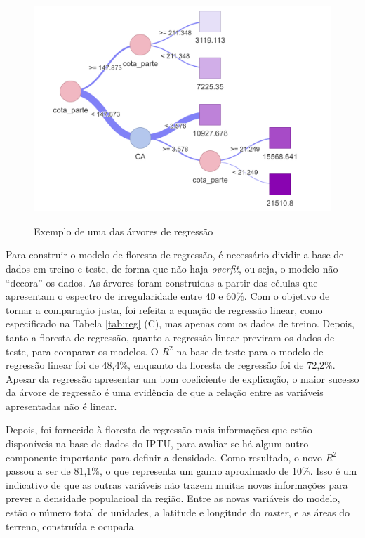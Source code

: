 \begin{figure}[h]
    \centering
    \caption{Exemplo de uma das árvores de regressão}
    \includegraphics[width = .8\linewidth]{imagens/tree_example.png}
    \label{fig:tree}
\end{figure}

Para construir o modelo de floresta de regressão, é necessário dividir a base de dados em treino e teste, de forma que não haja \textit{overfit}, ou seja, o modelo não ``decora'' os dados. As árvores foram construídas a partir das células que apresentam o espectro de irregularidade entre 40 e 60\%. Com o objetivo de tornar a comparação justa, foi refeita a equação de regressão linear, como especificado na Tabela \ref{tab:reg} (C), mas apenas com os dados de treino. Depois, tanto a floresta de regressão, quanto a regressão linear previram os dados de teste, para comparar os modelos. O $R^2$ na base de teste para o modelo de regressão linear foi de 48,4\%, enquanto da floresta de regressão foi de 72,2\%. Apesar da regressão apresentar um bom coeficiente de explicação, o maior sucesso da árvore de regressão é uma evidência de que a relação entre as variáveis apresentadas não é linear.

Depois, foi fornecido à floresta de regressão mais informações que estão disponíveis na base de dados do IPTU, para avaliar se há algum outro componente importante para definir a densidade. Como resultado, o novo $R^2$ passou a ser de 81,1\%, o que representa um ganho aproximado de 10\%. Isso é um indicativo de que as outras variáveis não trazem muitas novas informações para prever a densidade populacioal da região. Entre as novas variáveis do modelo, estão o número total de unidades, a latitude e longitude do \textit{raster}, e as áreas do terreno, construída e ocupada.

